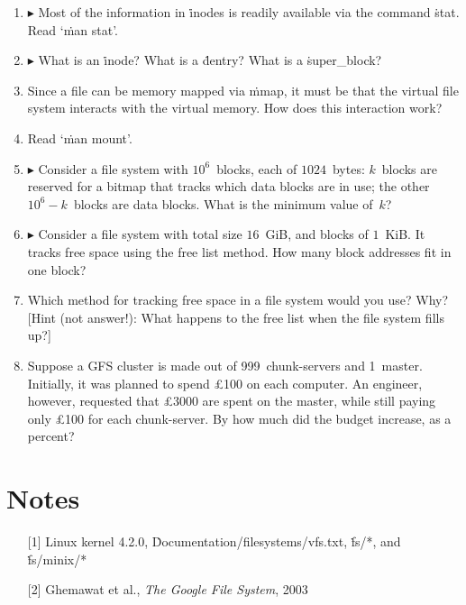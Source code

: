 \begin{enumerate}
\item
  $\blacktriangleright$
  Most of the information in \.{inode}s is readily available via the command \.{stat}.
  Read `\.{man stat}'.
\item
  $\blacktriangleright$
  What is an \.{inode}?
  What is a \.{dentry}?
  What is a \.{super\_block}?
\item
  Since a file can be memory mapped via \.{mmap},
    it must be that the virtual file system interacts with the virtual memory.
  How does this interaction work?
\item
  Read `\.{man mount}'.
\item
  $\blacktriangleright$
  Consider a file system with $10^6$~blocks, each of $1024$~bytes:
  $k$~blocks are reserved for a bitmap that tracks which data blocks are in use;
  the other $10^6-k$~blocks are data blocks.
  What is the minimum value of~$k$?
\item
  $\blacktriangleright$
  Consider a file system with total size $16$~GiB, and blocks of $1$~KiB.
  It tracks free space using the free list method.
  How many block addresses fit in one block?
\item
  Which method for tracking free space in a file system would you use?
  Why?
  [Hint (not answer!): What happens to the free list when the file system fills up?]
\item
  Suppose a GFS cluster is made out of 999~chunk-servers and 1~master.
  Initially, it was planned to spend \pounds100 on each computer.
  An engineer, however, requested that \pounds3000 are spent on the master,
    while still paying only \pounds100 for each chunk-server.
  By how much did the budget increase, as a percent?
\end{enumerate}

\section{Notes}

\begin{itemize}
\item[{[1]}]
  Linux kernel 4.2.0,
  \.{Documentation/filesystems/vfs.txt},
  \.{fs/*},
  and \.{fs/minix/*}
\item[{[2]}]
  Ghemawat et al., \emph{The Google File System}, 2003
\end{itemize}


